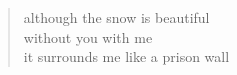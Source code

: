 \begin{verse}
although the snow is beautiful \\
without you with me \\
it surrounds me like a prison wall
\end{verse}
